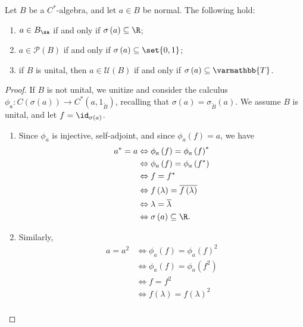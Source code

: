 \documentclass[10pt]{mypackage}
\renewcommand*{\mathbb}[1]{\varmathbb{#1}}
\newcommand{\T}{\mathbb{T}}
\begin{document}
\begin{proposition}
  Let $B$ be a $C^{\ast}$-algebra, and let $a\in B$ be normal. The following hold:
  \begin{enumerate}[(1)]
    \item $a\in B_{\sa}$ if and only if $\sigma\left(a\right)\subseteq \R$;
    \item $a\in \mathcal{P}\left(B\right)$ if and only if $\sigma\left(a\right)\subseteq \set{0,1}$;
    \item if $B$ is unital, then $a\in \mathcal{U}\left(B\right)$ if and only if $\sigma\left(a\right)\subseteq \T$.
  \end{enumerate}
\end{proposition}
\begin{proof}
  If $B$ is not unital, we unitize and consider the calculus $\phi_a\colon C\left(\sigma\left(a\right)\right)\rightarrow C^{\ast}\left(a,1_{\widetilde{B}}\right)$, recalling that $\sigma\left(a\right) = \sigma_{\widetilde{B}}(a)$. We assume $B$ is unital, and let $f = \id_{\sigma\left(a\right)}$.
  \begin{enumerate}[(1)]
    \item Since $\phi_a$ is injective, self-adjoint, and since $\phi_a\left(f\right) = a$, we have
      \begin{align*}
        a^{\ast} = a &\Leftrightarrow \phi_a\left(f\right) = \phi_a\left(f\right)^{\ast}\\
                     &\Leftrightarrow \phi_a\left(f\right) = \phi_a\left(f^{\ast}\right)\\
                     &\Leftrightarrow f = f^{\ast}\\
                     &\Leftrightarrow f\left(\lambda\right) = \overline{f\left(\lambda\right)}\\
                     &\Leftrightarrow \lambda = \overline{\lambda}\\
                     &\Leftrightarrow \sigma\left(a\right)\subseteq \R.
      \end{align*}
    \item Similarly,
      \begin{align*}
        a = a^2 &\Leftrightarrow \phi_a\left(f\right) = \phi_a\left(f\right)^2\\
                &\Leftrightarrow \phi_a\left(f\right) = \phi_a\left(f^2\right)\\
                &\Leftrightarrow f = f^2\\
                &\Leftrightarrow f\left(\lambda\right) = f\left(\lambda\right)^2\\

\end{align*}
\end{enumerate}
\end{proof}
\end{document}

